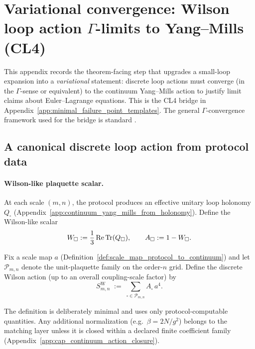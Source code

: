 \section{Variational convergence: Wilson loop action $\Gamma$-limits to Yang--Mills (CL4)}
\label{app:gamma_convergence_wilson_to_yang_mills}

This appendix records the theorem-facing step that upgrades a small-loop expansion into a \emph{variational} statement: discrete loop actions must converge (in the $\Gamma$-sense or equivalent) to the continuum Yang--Mills action to justify limit claims about Euler--Lagrange equations.
This is the CL4 bridge in Appendix~\ref{app:minimal_failure_point_templates}.
The general $\Gamma$-convergence framework used for the bridge is standard \cite{DalMaso1993GammaConvergence,Braides2002GammaConvergence}.

\subsection{A canonical discrete loop action from protocol data}
\paragraph{Wilson-like plaquette scalar.}
\MathTag At each scale $(m,n)$, the protocol produces an effective unitary loop holonomy $Q_\square$ (Appendix~\ref{app:continuum_yang_mills_from_holonomy}).
Define the Wilson-like scalar
\[
W_\square:=\frac{1}{3}\operatorname{Re}\mathrm{Tr}(Q_\square),\qquad A_\square:=1-W_\square.
\]

\begin{definition}
\label{def:protocol_wilson_action_functional_template}
\MathTag Fix a scale map $a$ (Definition~\ref{def:scale_map_protocol_to_continuum}) and let $\mathcal{P}_{m,n}$ denote the unit-plaquette family on the order-$n$ grid.
Define the discrete Wilson action (up to an overall coupling-scale factor) by
\begin{equation}
\label{eq:protocol_wilson_action}
S_{m,n}^{\mathrm{W}} \;:=\; \sum_{\square\in\mathcal{P}_{m,n}} A_\square\,a^{4}.
\end{equation}
\end{definition}

\AuditTag The definition is deliberately minimal and uses only protocol-computable quantities.
Any additional normalization (e.g.\ $\beta=2N/g^2$) belongs to the matching layer unless it is closed within a declared finite coefficient family (Appendix~\ref{app:cap_continuum_action_closure}).

